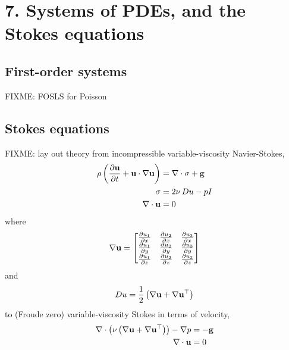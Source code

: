 \chapter{7. Systems of PDEs, and the Stokes equations}

\section{First-order systems}

FIXME: FOSLS for Poisson

\section{Stokes equations}

FIXME: lay out theory from incompressible variable-viscosity Navier-Stokes,
\begin{align*}
\rho \left(\frac{\partial \mathbf{u}}{\partial t} + \mathbf{u} \cdot \nabla \mathbf{u}\right) &= \nabla\cdot \sigma + \mathbf{g} \\
\sigma &= 2 \nu\, Du - p I \\
\nabla\cdot \mathbf{u} &= 0
\end{align*}
where
  $$\nabla \mathbf{u} = \begin{bmatrix}
    \frac{\partial u_1}{\partial x} & \frac{\partial u_2}{\partial x} & \frac{\partial u_3}{\partial x} \\
    \frac{\partial u_1}{\partial y} & \frac{\partial u_2}{\partial y} & \frac{\partial u_3}{\partial y} \\
    \frac{\partial u_1}{\partial z} & \frac{\partial u_2}{\partial z} & \frac{\partial u_3}{\partial z}
    \end{bmatrix}$$
and
    $$D u = \frac{1}{2} \left(\nabla \mathbf{u} + \nabla \mathbf{u}^{\top}\right)$$
to (Froude zero) variable-viscosity Stokes in terms of velocity,
\begin{align*}
\nabla\cdot \left(\nu \left(\nabla \mathbf{u} + \nabla \mathbf{u}^{\top}\right)\right) - \nabla p &= - \mathbf{g} \\
\nabla\cdot \mathbf{u} &= 0
\end{align*}

